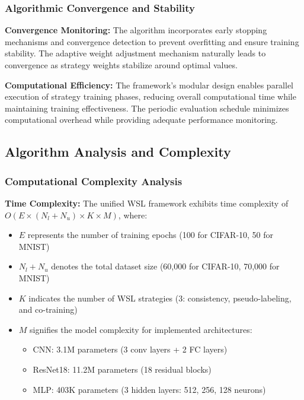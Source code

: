 \documentclass{ieeeaccess}
\begin{document}
\subsubsection{Algorithmic Convergence and Stability}

\textbf{Convergence Monitoring:} The algorithm incorporates early stopping mechanisms and convergence detection to prevent overfitting and ensure training stability. The adaptive weight adjustment mechanism naturally leads to convergence as strategy weights stabilize around optimal values.

\textbf{Computational Efficiency:} The framework's modular design enables parallel execution of strategy training phases, reducing overall computational time while maintaining training effectiveness. The periodic evaluation schedule minimizes computational overhead while providing adequate performance monitoring.

\subsection{Algorithm Analysis and Complexity}

\subsubsection{Computational Complexity Analysis}

\textbf{Time Complexity:} The unified WSL framework exhibits time complexity of $O(E \times (N_l + N_u) \times K \times M)$, where:
\begin{itemize}
\item $E$ represents the number of training epochs (100 for CIFAR-10, 50 for MNIST)
\item $N_l + N_u$ denotes the total dataset size (60,000 for CIFAR-10, 70,000 for MNIST)
\item $K$ indicates the number of WSL strategies (3: consistency, pseudo-labeling, and co-training)
\item $M$ signifies the model complexity for implemented architectures:
    \begin{itemize}
    \item CNN: 3.1M parameters (3 conv layers + 2 FC layers)
    \item ResNet18: 11.2M parameters (18 residual blocks)
    \item MLP: 403K parameters (3 hidden layers: 512, 256, 128 neurons)
    \end{itemize}
\end{itemize}
\end{document}

